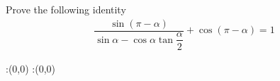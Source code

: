 
%
%
%
%
% 
% 

\question Prove the following identity
\begin{align}
  \dfrac{\sin(\pi - \alpha)}{\sin\alpha - 
  	\cos\alpha\tan\dfrac{\alpha}{2}}
  	+ \cos(\pi - \alpha) = 1 \nonumber
\end{align}

\insertQR{}

\ifprintanswers
  \begin{marginfigure}
      :(0,0)
      :(0,0)
    \figdrawbegin{}
      \figdrawline [100,101]
    \figdrawend
    \figvisu{\figBoxA}{}{%
    }
    \centerline{\box\figBoxA}
  \end{marginfigure}
\fi 

